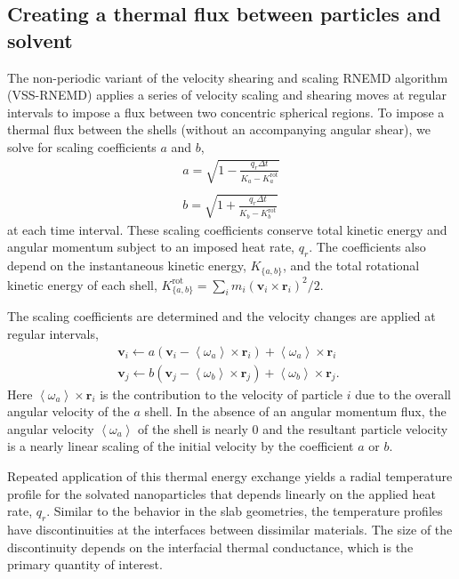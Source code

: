\documentclass[aps,jcp,preprint,showpacs,superscriptaddress,groupedaddress]{revtex4-1}  %
\begin{document}
\subsection{Creating a thermal flux between particles and solvent}

The non-periodic variant of the velocity shearing and scaling RNEMD
algorithm (VSS-RNEMD)\cite{Stocker:2014qq} applies a series of
velocity scaling and shearing moves at regular intervals to impose a
flux between two concentric spherical regions. To impose a thermal
flux between the shells (without an accompanying angular shear), we
solve for scaling coefficients $a$ and $b$,
\begin{eqnarray}
	a = \sqrt{1 - \frac{q_r \Delta t}{K_a - K_a^\mathrm{rot}}}\\ \nonumber\\
	b = \sqrt{1 + \frac{q_r \Delta t}{K_b - K_b^\mathrm{rot}}}
\end{eqnarray}
at each time interval.  These scaling coefficients conserve total
kinetic energy and angular momentum subject to an imposed heat rate,
$q_r$.  The coefficients also depend on the instantaneous kinetic
energy, $K_{\{a,b\}}$, and the total rotational kinetic energy of each
shell, $K_{\{a,b\}}^\mathrm{rot} = \sum_i m_i \left( \mathbf{v}_i
  \times \mathbf{r}_i \right)^2 / 2$.

The scaling coefficients are determined and the velocity changes are
applied at regular intervals, 
\begin{eqnarray}
	\mathbf{v}_i \leftarrow a \left ( \mathbf{v}_i - \left < \omega_a \right > \times \mathbf{r}_i \right ) + \left < \omega_a \right > \times \mathbf{r}_i~~\:\\
	\mathbf{v}_j \leftarrow b \left ( \mathbf{v}_j - \left < \omega_b \right > \times \mathbf{r}_j \right ) + \left < \omega_b \right > \times \mathbf{r}_j.
\end{eqnarray}
Here $\left < \omega_a \right > \times \mathbf{r}_i$ is the
contribution to the velocity of particle $i$ due to the overall
angular velocity of the $a$ shell. In the absence of an angular
momentum flux, the angular velocity $\left < \omega_a \right >$ of the
shell is nearly 0 and the resultant particle velocity is a nearly
linear scaling of the initial velocity by the coefficient $a$ or $b$.

Repeated application of this thermal energy exchange yields a radial
temperature profile for the solvated nanoparticles that depends
linearly on the applied heat rate, $q_r$. Similar to the behavior in
the slab geometries, the temperature profiles have discontinuities at
the interfaces between dissimilar materials.  The size of the
discontinuity depends on the interfacial thermal conductance, which is
the primary quantity of interest.
\end{document}
